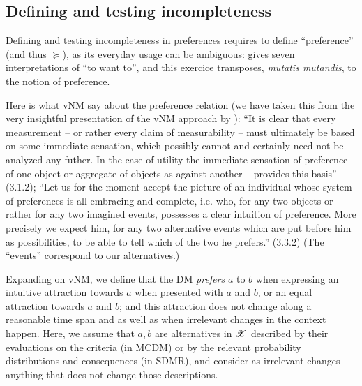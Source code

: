 \documentclass[french, english]{llncs}
\begin{document}
\subsection{Defining and testing incompleteness}
\label{sec:empirical}
Defining and testing incompleteness in preferences requires to define “preference” (and thus $\succeq$), as its everyday usage can be ambiguous: \citet{frankfurt_freedom_1971} gives seven interpretations of “to want to”, and this exercice transposes, \emph{mutatis mutandis}, to the notion of preference.
	
	
Here is what vNM say about the preference relation (we have taken this from the very insightful presentation of the vNM approach by \citet{fishburn_retrospective_1989}):
“It is clear that every measurement – or rather every claim of measurability – must ultimately be based on some immediate sensation, 
which possibly cannot and certainly need not be analyzed any futher.
In the case of utility the immediate sensation of preference – of one object or aggregate of objects as against another – 
provides this basis” (3.1.2);
“Let us for the moment accept the picture of an individual whose system of preferences is all-embracing and complete, i.e. who, for any two objects or rather for any two imagined events, possesses a clear intuition of preference. More precisely
 we expect him, for any two alternative events which are put before him as possibilities, to be able to tell which of the two he prefers.” (3.3.2) (The “events” correspond to our alternatives.)
	
Expanding on vNM, we define that the \ac{DM} \emph{prefers} $a$ to $b$ when expressing an intuitive attraction towards $a$ when presented with $a$ and $b$, or an equal attraction towards $a$ and $b$; and this attraction does not change along a reasonable time span and as well as when irrelevant changes in the context happen. %
Here, we assume that $a, b$ are alternatives in $\mathscr{X}$ described by their evaluations on the criteria (in MCDM) or by the relevant probability distributions and consequences (in SDMR), and consider as irrelevant changes anything that does not change those descriptions. 
\end{document}
